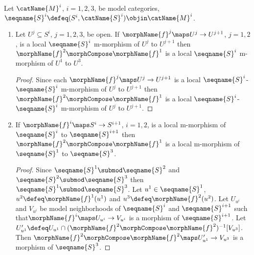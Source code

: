 \documentclass{article}
\begin{document}
\begin{corollary}[[Composition of local m-morphisms]
\label{cor:modlocalMmorphcomp}
Let $\catName{M}^i$, $i=1,2,3$, be model categories,
$\seqname{S}^i \defeq (S^i, \catName{S}^i) \objin \catName{M}^i$.

\begin{enumerate}
\item
Let $U^j \subseteq S^i$, $j=1,2,3$, be open.
If $\morphName{f}^j \maps U^j \to U^{j+1}$, $j=1,2$, is a local
$\seqname{S}^i$ m-morphism of $U^j$ to $U^{j+1}$ then
$\morphName{f}^2 \morphCompose \morphName{f}^1$ is a local
$\seqname{S}^i$ m-morphism of $U^1$ to $U^3$.

\begin{proof}
Since each  $\morphName{f}^j \maps U^j \to U^{j+1}$ is a local
$\seqname{S}^i$-$\seqname{S}^i$ m-morphism of $U^j$ to $U^{j+1}$ then
$\morphName{f}^2 \morphCompose \morphName{f}^1$ is a local
$\seqname{S}^i$-$\seqname{S}^i$ m-morphism of $U^j$ to $U^{j+1}$.
\end{proof}

\item
If $\morphName{f}^i \maps S^i \to S^{i+1}$, $i=1,2$, is a local
m-morphism of $\seqname{S}^i$ to $\seqname{S}^{i+1}$ then
$\morphName{f}^2 \morphCompose \morphName{f}^1$ is a local m-morphism of
$\seqname{S}^1$ to $\seqname{S}^3$.

\begin{proof}
Since $\seqname{S}^1 \submod \seqname{S}^2$ and
$\seqname{S}^2 \submod \seqname{S}^3$ then
$\seqname{S}^1 \submod \seqname{S}^3$.
Let $u^1 \in \seqname{S}^1$, $u^2 \defeq \morphName{f}^1(u^1)$ and
$u^3 \defeq \morphName{f}^2(u^2)$.
Let $U_{u^i}$ and $V_{u^i}$ be model neighborhoods of $\seqname{S}^i$ and $\seqname{S}^{i+1}$
such that$\morphName{f}^i \maps U_{u^i} \to V_{u^i}$ is a morphism of $\seqname{S}^{i+1}$.
Let
\nobreaks
  {{
    $
      U'_{u^1} \defeq
      U_{u^1} \cap (\morphName{f}^2 \morphCompose \morphName{f}^2)^{-1}[V_{u^3}]
    $.
  }}
Then $\morphName{f}^2 \morphCompose \morphName{f}^2 \maps U'_{u^1} \to V_{u^3}$
is a morphism of $\seqname{S}^3$.
\end{proof}
\end{enumerate}

\end{corollary}
\end{document}
